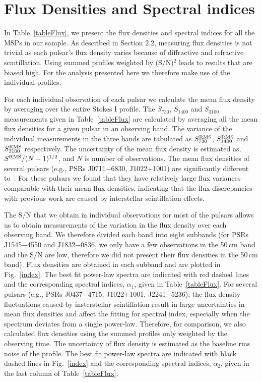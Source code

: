 \documentclass[useAMS,usenatbib]{mn2e}
\begin{document}
\section{Flux Densities and Spectral indices}


In Table~\ref{tableFlux}, we present the flux densities and spectral indices 
for all the MSPs in our sample. As described in Section $2.2$, measuring flux 
densities is not trivial as each pulsar's flux density varies because 
of diffractive and refractive scintillation. Using summed profiles weighted by 
(S/N)$^2$ leads to results that are biased high. For the analysis presented 
here we therefore make use of the individual profiles. 
%

For each individual observation of each pulsar we calculate the mean flux 
density by averaging over the entire Stokes I profile. 
%
The $S_{730}$, $S_{1400}$ and $S_{3100}$ measurements given in Table~\ref{tableFlux} 
are calculated by averaging all the mean flux densities for a given pulsar 
in an observing band.  
%
The variance of the individual measurements in the three bands are tabulated 
as $S^{\rm{RMS}}_{730}$, $S^{\rm{RMS}}_{1400}$ and $S^{\rm{RMS}}_{3100}$ respectively. 
%
The uncertainty of the mean flux density is estimated as, $S^{\rm{RMS}}/(N-1)^{1/2}$, 
and $N$ is number of observations.
%
The mean flux densities of several pulsars (e.g., PSRs J0711$-$6830, J1022$+$1001) 
are significantly different to~\citet{Yan11}. For these pulsars we found that 
they have relatively large flux variances comparable with their mean flux densities, 
indicating that the flux discrepancies with previous work are caused by interstellar 
scintillation effects.
%

The S/N that we obtain in individual observations for most of the pulsars allows us 
to obtain measurements of the variation in the flux density over each observing band. 
We therefore divided each band into eight subbands (for PSRs J1545$-$4550 and J1832$-$0836, 
we only have a few observations in the 50\,cm band and the S/N are low, therefore we 
did not present their flux densities in the 50\,cm band).
%
Flux densities are obtained in each subband and are plotted in Fig.~\ref{index}. 
%
The best fit power-law spectra are indicated with red dashed lines and the corresponding 
spectral indices, $\alpha_1$, given in Table~\ref{tableFlux}.
%
For several pulsars (e.g., PSRs J0437$-$4715, J1022$+$1001, J2241$-$5236), the flux density 
fluctuations caused by insterstellar scintillation result in large uncertainties in 
mean flux densities and affect the fitting for spectral index, especially when the 
spectrum deviates from a single power-law.
%
Therefore, for comparison, we also calculated flux densities using the summed profiles 
only weighted by the observing time. The uncertainty of flux density is estimated 
as the baseline rms noise of the profile. 
%
The best fit power-law spectra are indicated with black dashed lines in Fig.~\ref{index} 
and the corresponding spectral indices, $\alpha_2$, given in the last column of Table~\ref{tableFlux}.
%
\end{document}
